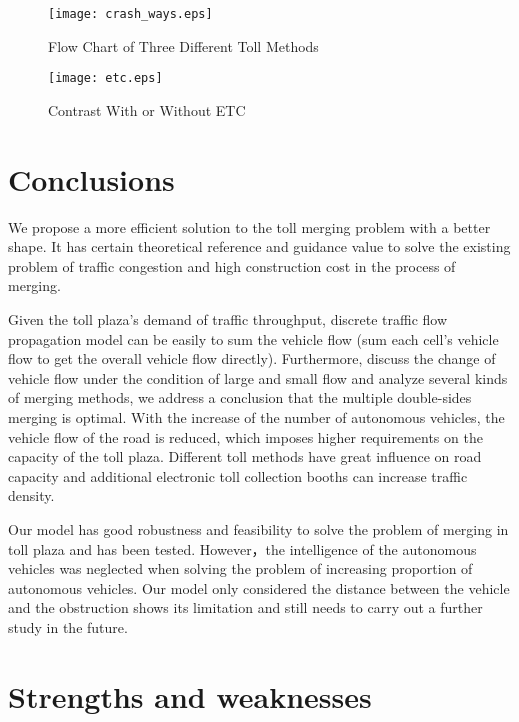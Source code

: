 \documentclass{mcmthesis}
\begin{document}

\begin{figure}
	\centering
	\texttt{[image: crash\_ways.eps]}
	\caption{Flow Chart of Three Different Toll Methods}
	\label{fig:crash_ways}
\end{figure}

\begin{figure}[!htbp]
	\small
	\centering
	\texttt{[image: etc.eps]}
	\caption{Contrast With or Without ETC} 
	\label{fig:etc}
\end{figure}
\section{Conclusions}
We propose a more efficient solution to the toll merging problem with a better shape. It has certain theoretical reference and guidance value to solve the existing problem of traffic congestion and high construction cost in the process of merging.

Given the toll plaza’s demand of traffic throughput, discrete traffic flow propagation model can be easily to sum the vehicle flow (sum each cell’s vehicle flow to get the overall vehicle flow directly). Furthermore, discuss the change of vehicle flow under the condition of large and small flow and analyze several kinds of merging methods, we address a conclusion that the multiple double-sides merging is optimal. With the increase of the number of autonomous vehicles, the vehicle flow of the road is reduced, which imposes higher requirements on the capacity of the toll plaza. Different toll methods have great influence on road capacity and additional electronic toll collection booths can increase traffic density.

Our model has good robustness and feasibility to solve the problem of merging in toll plaza and has been tested. However，the intelligence of the autonomous vehicles was neglected when solving the problem of increasing proportion of autonomous vehicles. Our model only considered the distance between the vehicle and the obstruction shows its limitation and still needs to carry out a further study in the future.
\section{Strengths and weaknesses}
\end{document}

